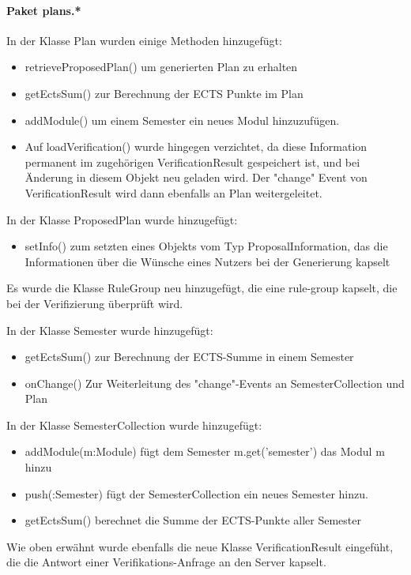 \paragraph{Paket plans.*}
In der Klasse Plan wurden einige Methoden hinzugefügt:
\begin{itemize}
	\item retrieveProposedPlan() um generierten Plan zu erhalten
	\item getEctsSum() zur Berechnung der ECTS Punkte im Plan
	\item addModule() um einem Semester ein neues Modul hinzuzufügen.
	\item Auf loadVerification() wurde hingegen verzichtet, da diese Information permanent im zugehörigen VerificationResult gespeichert ist, und bei Änderung in diesem Objekt neu geladen wird. Der "change" Event von VerificationResult wird dann ebenfalls an Plan weitergeleitet.
\end{itemize}

In der Klasse ProposedPlan wurde hinzugefügt:
\begin{itemize}
	\item setInfo() zum setzten eines Objekts vom Typ ProposalInformation, das die Informationen über die Wünsche eines Nutzers bei der Generierung kapselt
\end{itemize}

Es wurde die Klasse RuleGroup neu hinzugefügt, die eine rule-group kapselt, die bei der Verifizierung überprüft wird.

In der Klasse Semester wurde hinzugefügt:
\begin{itemize}
	\item getEctsSum() zur Berechnung der ECTS-Summe in einem Semester
	\item onChange() Zur Weiterleitung des "change"-Events an SemesterCollection und Plan
\end{itemize}

In der Klasse SemesterCollection wurde hinzugefügt:
\begin{itemize}
	\item addModule(m:Module) fügt dem Semester m.get('semester') das Modul m hinzu
	\item push(:Semester) fügt der SemesterCollection ein neues Semester hinzu.
	\item getEctsSum() berechnet die Summe der ECTS-Punkte aller Semester
\end{itemize}

Wie oben erwähnt wurde ebenfalls die neue Klasse VerificationResult eingefüht, die die Antwort einer Verifikations-Anfrage an den Server kapselt.